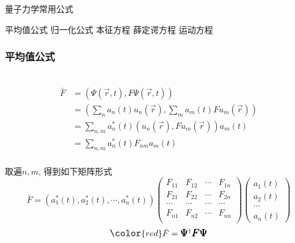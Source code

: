 \begin{frame} 
    \frametitle{}
    \begin{tcolorbox2}{量子力学常用公式}
        \begin{itemize}
            \Item 平均值公式
            \Item 归一化公式
            \Item 本征方程
            \Item 薛定谔方程
            \Item 运动方程
        \end{itemize}   
    \end{tcolorbox2}
\end{frame} 

\begin{frame} 
    \frametitle{平均值公式}
    \解~ 
    \begin{equation*}
        \begin{split}
            \bar{F}&=(\Psi(\vec{r},t), F\Psi(\vec{r},t)) \\
            &= (\sum_n a_n(t) u_n(\vec{r}), \sum_m a_m(t) F u_m(\vec{r}))\\
            &= \sum_{n,m} a_n ^*(t) (u_n(\vec{r}), F u_m(\vec{r})) a_m(t)\\
            &= \sum_{n,m} a_n ^*(t) F_{nm} a_m(t)\\
        \end{split} 
    \end{equation*}
\end{frame}

\begin{frame} 
    取遍$n, m$, 得到如下矩阵形式\\
    $$\bar{F} =(a_1 ^*(t), a_2 ^*(t),\cdots,a_n^*(t) )
    \begin{pmatrix}
       F_{11} & F_{12} & \cdots & F_{1n} \\
       F_{21} & F_{22} & \cdots & F_{2n} \\
       \cdots & \cdots &  \cdots& \cdots\\
        F_{n1} & F_{n2} & \cdots & F_{nn} \\
    \end{pmatrix}
    \begin{pmatrix}
        a_1(t)\\
        a_2(t)\\
        \cdots \\
        a_n(t)
    \end{pmatrix}
    $$ \vspace{1.0em} 
    $$ \large \color{red} \bar{F} = \pmb {\Psi} ^{\dagger } \pmb {F} \pmb {\Psi} $$
\end{frame}

